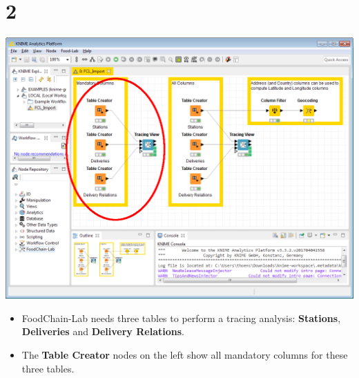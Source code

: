 \documentclass{beamer}
\begin{document}
\section{2}
\begin{frame}
	\begin{center}
  		\includegraphics[height=0.6\textheight]{2.png}
	\end{center}
	\begin{itemize}
		\item FoodChain-Lab needs three tables to perform a tracing analysis: \textbf{Stations}, \textbf{Deliveries} and \textbf{Delivery Relations}.
		\item The \textbf{Table Creator} nodes on the left show all mandatory columns for these three tables.
	\end{itemize}
\end{frame}
\end{document}
